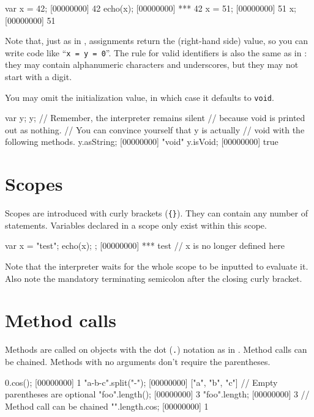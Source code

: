 \begin{urbiscript}
var x = 42;
[00000000] 42
echo(x);
[00000000] *** 42
x = 51;
[00000000] 51
x;
[00000000] 51
\end{urbiscript}

Note that, just as in \Cxx, assignments return the (right-hand side) value, so
you can write code like ``\lstinline|x = y = 0|''. The rule for valid
identifiers is also the same as in \Cxx: they may contain alphanumeric
characters and underscores, but they may not start with a digit.

You may omit the initialization value, in which case it defaults to
\lstinline|void|.

\begin{urbiscript}
var y;
y;
// Remember, the interpreter remains silent
// because void is printed out as nothing.
// You can convince yourself that y is actually
// void with the following methods.
y.asString;
[00000000] "void"
y.isVoid;
[00000000] true
\end{urbiscript}

\section{Scopes}
Scopes are introduced with curly brackets (\lstinline|{}|).  They can
contain any number of statements. Variables declared in a scope only
exist within this scope.

\begin{urbiscript}
{
  var x = "test";
  echo(x);
};
[00000000] *** test
// x is no longer defined here
\end{urbiscript}

Note that the interpreter waits for the whole scope to be inputted to
evaluate it. Also note the mandatory terminating semicolon after the
closing curly bracket.

\section{Method calls}

Methods are called on objects with the dot (\lstinline{.}) notation as in
\Cxx. Method calls can be chained. Methods with no arguments don't
require the parentheses.

\begin{urbiscript}
0.cos();
[00000000] 1
"a-b-c".split("-");
[00000000] ["a", "b", "c"]
// Empty parentheses are optional
"foo".length();
[00000000] 3
"foo".length;
[00000000] 3
// Method call can be chained
"".length.cos;
[00000000] 1
\end{urbiscript}

